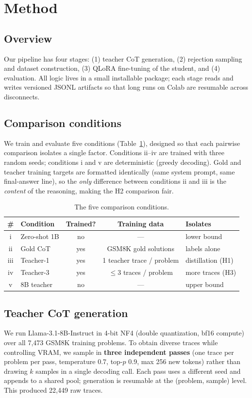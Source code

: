 \documentclass[11pt]{article}
\begin{document}
\section{Method}
\label{sec:method}
\subsection{Overview}
Our pipeline has four stages: (1) teacher CoT generation, (2) rejection sampling
and dataset construction, (3) QLoRA fine-tuning of the student, and (4) evaluation.
All logic lives in a small installable package; each stage reads and writes
versioned JSONL artifacts so that long runs on Colab are resumable across
disconnects.

\subsection{Comparison conditions}
We train and evaluate five conditions (Table~\ref{tab:conditions}), designed so
that each pairwise comparison isolates a single factor. Conditions ii--iv are
trained with three random seeds; conditions i and v are deterministic (greedy
decoding). Gold and teacher training targets are formatted identically (same system
prompt, same final-answer line), so the \emph{only} difference between conditions
ii and iii is the \emph{content} of the reasoning, making the H2 comparison fair.

\begin{table}[H]
\centering
\caption{The five comparison conditions.}
\label{tab:conditions}
\begin{tabular}{clccl}
\toprule
\# & Condition & Trained? & Training data & Isolates \\
\midrule
i   & Zero-shot 1B      & no  & ---                       & lower bound \\
ii  & Gold CoT          & yes & GSM8K gold solutions      & labels alone \\
iii & Teacher-1         & yes & 1 teacher trace / problem & distillation (H1) \\
iv  & Teacher-3         & yes & $\le$3 traces / problem   & more traces (H3) \\
v   & 8B teacher        & no  & ---                       & upper bound \\
\bottomrule
\end{tabular}
\end{table}

\subsection{Teacher CoT generation}
We run Llama-3.1-8B-Instruct in 4-bit NF4 (double quantization, bf16 compute) over
all 7{,}473 GSM8K training problems. To obtain diverse traces while controlling
VRAM, we sample in \textbf{three independent passes} (one trace per problem per
pass, temperature 0.7, top-$p$ 0.9, max 256 new tokens) rather than drawing $k$
samples in a single decoding call. Each pass uses a different seed and appends to a
shared pool; generation is resumable at the (problem, sample) level. This produced
22{,}449 raw traces.
\end{document}
